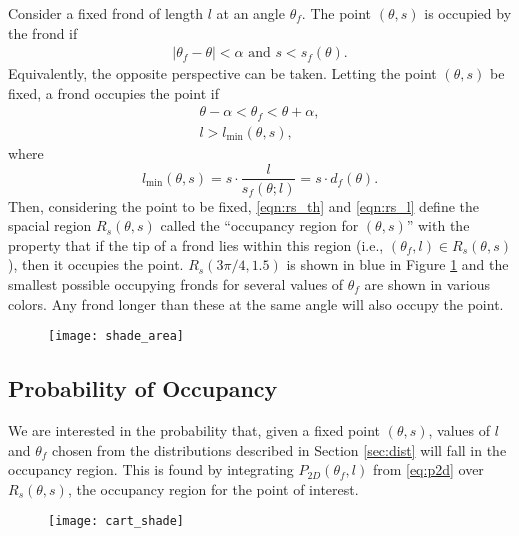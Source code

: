 Consider a fixed frond of length $l$ at an angle $\theta_f$. The point
$(\theta,s)$ is occupied by the frond if
\begin{align*}
	\left|\theta_f - \theta \right| < \alpha
  \mbox{ and }
	s < s_f(\theta).
\end{align*}
Equivalently, the opposite perspective can be taken.
Letting the point $(\theta,s)$ be fixed, a frond occupies the point if
\begin{align}
	\theta - \alpha < \theta_f < \theta + \alpha,
	\label{eqn:rs_th} \\
	l > l_{\min}(\theta,s),
	\label{eqn:rs_l}
\end{align}
where
\begin{equation*}
	l_{\min}(\theta,s) = s \cdot \frac{l}{s_f(\theta;l)} = s \cdot d_f(\theta).
\end{equation*}
Then, considering the point to be fixed, \eqref{eqn:rs_th} and \eqref{eqn:rs_l} define the spacial region $R_s(\theta,s)$ called the ``occupancy region for $(\theta,s)$'' with the property that if the tip of a frond lies within this region (i.e., $(\theta_f,l) \in R_s(\theta,s)$), then it occupies the point.
$R_s(3\pi/4,1.5)$ is shown in blue in Figure \ref{fig:shade_area} and the smallest possible occupying fronds for several values of $\theta_f$ are shown in various colors.
Any frond longer than these at the same angle will also occupy the point.

\begin{figure}[h]
	\centering
	\texttt{[image: shade\_area]}
	\label{fig:shade_area}
\end{figure}

\subsection{Probability of Occupancy}
We are interested in the probability that, given a fixed point $(\theta,s)$, values of $l$ and $\theta_f$ chosen from the distributions described in Section \ref{sec:dist} will fall in the occupancy region.
This is found by integrating $P_{2D}(\theta_f, l)$ from \eqref{eq:p2d} over $R_s(\theta,s)$, the occupancy region for the point of interest.

\begin{figure}[h]
	\centering
	\texttt{[image: cart\_shade]}
	\label{fig:cart_shade}
\end{figure}

